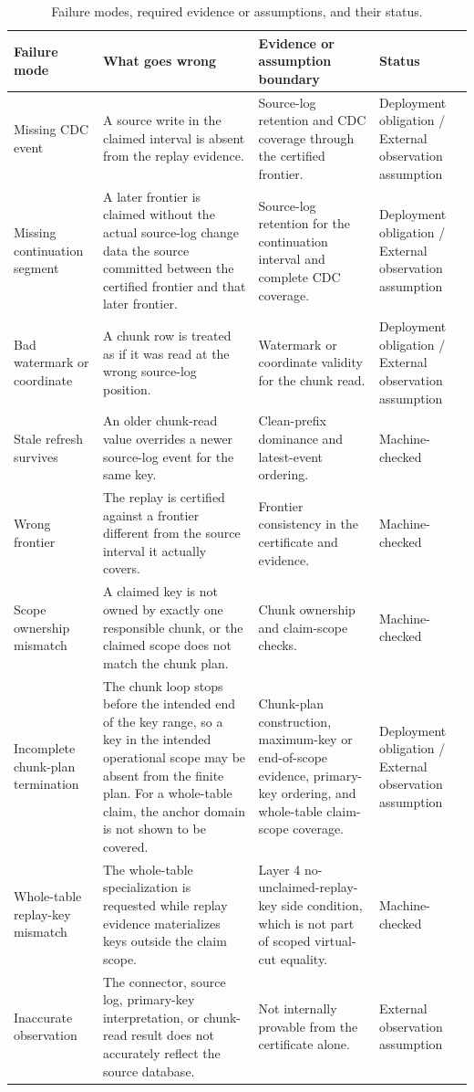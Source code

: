 \documentclass[letterpaper,10pt,twocolumn]{article}
\begin{document}
\begin{table}[t]
\caption{Failure modes, required evidence or assumptions, and their
status.}
\label{tab:failure-modes}
\centering\small
\begin{tabularx}{\textwidth}{@{}p{1.55in}YYY@{}}
\toprule
\textbf{Failure mode} & \textbf{What goes wrong} &
\textbf{Evidence or assumption boundary} & \textbf{Status}\\
\midrule
Missing CDC event &
  A source write in the claimed interval is absent from the replay
  evidence. &
  Source-log retention and CDC coverage through the certified
  frontier. &
  Deployment obligation / External observation assumption\\
Missing continuation segment &
  A later frontier is claimed without the actual source-log change
  data the source committed between the certified frontier and that
  later frontier. &
  Source-log retention for the continuation interval and complete CDC
  coverage. &
  Deployment obligation / External observation assumption\\
Bad watermark or coordinate &
  A chunk row is treated as if it was read at the wrong source-log
  position. &
  Watermark or coordinate validity for the chunk read. &
  Deployment obligation / External observation assumption\\
Stale refresh survives &
  An older chunk-read value overrides a newer source-log event for
  the same key. &
  Clean-prefix dominance and latest-event ordering. &
  Machine-checked\\
Wrong frontier &
  The replay is certified against a frontier different from the
  source interval it actually covers. &
  Frontier consistency in the certificate and evidence. &
  Machine-checked\\
Scope ownership mismatch &
  A claimed key is not owned by exactly one responsible chunk, or the
  claimed scope does not match the chunk plan. &
  Chunk ownership and claim-scope checks. &
  Machine-checked\\
Incomplete chunk-plan termination &
  The chunk loop stops before the intended end of the key range, so a
  key in the intended operational scope may be absent from the finite
  plan. For a whole-table claim, the anchor domain is not shown to be
  covered. &
  Chunk-plan construction, maximum-key or end-of-scope evidence,
  primary-key ordering, and whole-table claim-scope coverage. &
  Deployment obligation / External observation assumption\\
Whole-table replay-key mismatch &
  The whole-table specialization is requested while replay evidence
  materializes keys outside the claim scope. &
  Layer 4 no-unclaimed-replay-key side condition, which is not part of scoped
  virtual-cut equality. &
  Machine-checked\\
Inaccurate observation &
  The connector, source log, primary-key interpretation, or
  chunk-read result does not accurately reflect the source database. &
  Not internally provable from the certificate alone. &
  External observation assumption\\
\bottomrule
\end{tabularx}
\end{table}
\end{document}
